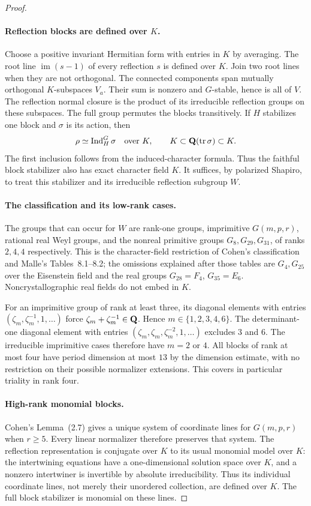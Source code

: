 \begin{proof}
\paragraph{Reflection blocks are defined over $K$.}
Choose a positive invariant Hermitian form with entries in $K$ by
averaging. The root line $\operatorname{im}(s-1)$ of every reflection
$s$ is defined over $K$. Join two root lines when they are not orthogonal.
The connected components span mutually orthogonal $K$-subspaces $V_a$.
Their sum is nonzero and $G$-stable, hence is all of $V$.
The reflection normal closure is the product of its irreducible
reflection groups on these subspaces. The full group permutes the
blocks transitively. If $H$ stabilizes one block and $\sigma$ is its
action, then
\[
 \rho\simeq\operatorname{Ind}_H^G\sigma\quad\hbox{over }K,
 \qquad
 K\subset\mathbf Q(\operatorname{tr}\sigma)\subset K.
\]
The first inclusion follows from the induced-character formula. Thus
the faithful block stabilizer also has exact character field $K$.
It suffices, by polarized Shapiro, to treat this stabilizer and its
irreducible reflection subgroup $W$.

\paragraph{The classification and its low-rank cases.}
The groups that can occur for $W$ are rank-one groups, imprimitive
$G(m,p,r)$, rational real Weyl groups, and the nonreal primitive groups
$G_8,G_{29},G_{31}$, of ranks $2,4,4$ respectively. This is the
character-field restriction of Cohen's classification and Malle's
Tables~8.1--8.2; the omissions explained after those tables are
$G_4,G_{25}$ over the Eisenstein field and the real groups
$G_{28}=F_4$, $G_{35}=E_6$. Noncrystallographic real fields do not
embed in $K$.

For an imprimitive group of rank at least three, its diagonal elements
with entries $(\zeta_m,\zeta_m^{-1},1,\ldots)$ force
$\zeta_m+\zeta_m^{-1}\in\mathbf Q$. Hence $m\in\{1,2,3,4,6\}$.
The determinant-one diagonal element with entries
$(\zeta_m,\zeta_m,\zeta_m^{-2},1,\ldots)$ excludes $3$ and $6$.
The irreducible imprimitive cases therefore have $m=2$ or $4$.
All blocks of rank at most four have period dimension at most $13$
by the dimension estimate, with no restriction on their possible normalizer extensions.
This covers in particular triality in rank four.

\paragraph{High-rank monomial blocks.}
Cohen's Lemma~(2.7) gives a unique system of coordinate lines for
$G(m,p,r)$ when $r\ge5$. Every linear normalizer therefore preserves
that system. The reflection representation is conjugate over $K$ to
its usual monomial model over $K$: the intertwining equations have a
one-dimensional solution space over $K$, and a nonzero intertwiner is
invertible by absolute irreducibility. Thus its individual coordinate
lines, not merely their unordered collection, are defined over $K$.
The full block stabilizer is monomial on these lines.


\end{proof}
